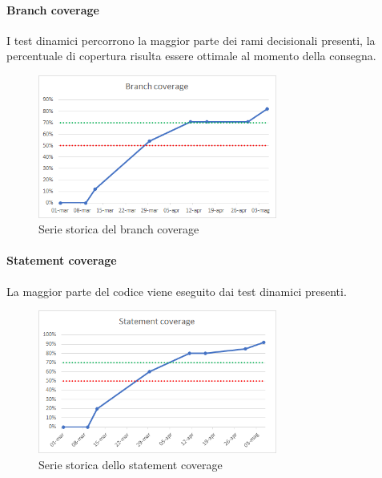     \paragraph{Branch coverage} \Spazio
    I test dinamici percorrono la maggior parte dei rami decisionali presenti, la percentuale di copertura risulta essere ottimale al momento della consegna. 
    \begin{figure}[H]
    	\centering 
    	\includegraphics[width=0.7\textwidth]{Images/branch.png}
    	\caption{Serie storica del branch coverage}
    	\label{branch} 
    \end{figure}
    \paragraph{Statement coverage} \Spazio
    La maggior parte del codice viene eseguito dai test dinamici presenti.
    \begin{figure}[H]
    	\centering 
    	\includegraphics[width=0.7\textwidth]{Images/statement.png}
    	\caption{Serie storica dello statement coverage}
    	\label{statement} 
    \end{figure}
